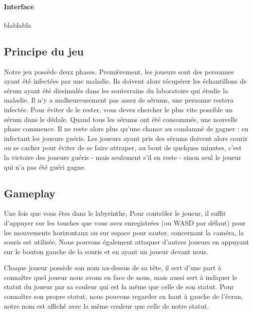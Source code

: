 \documentclass{article}
\begin{document}
\paragraph{Interface}
blablabla




\newpage
\subsection{Principe du jeu}


Notre jeu possède deux phases.
Premièrement, les joueurs sont des personnes ayant été infectées par une maladie. Ils doivent alors récupérer les échantillons de sérum ayant été dissimulés dans les souterrains du laboratoire qui étudie la maladie. Il n'y a malheureusement pas assez de sérums, une personne restera infectée. Pour éviter de le rester, vous devez chercher le plus vite possible un sérum dans le dédale.
Quand tous les sérums ont été consommés, une nouvelle phase commence. Il ne reste alors plus qu'une chance au condamné de gagner : en infectant les joueurs guéris. Les joueurs ayant pris des sérums doivent alors courir ou se cacher pour éviter de se faire attraper, au bout de quelques minutes, c'est la victoire des joueurs guéris - mais seulement s'il en reste - sinon seul le joueur qui n'a pas été guéri gagne.




\subsection{Gameplay}


Une fois que vous êtes dans le labyrinthe,
Pour contrôler le joueur, il suffit d'appuyer sur les touches que vous avez enregistrées (ou WASD par défaut) pour les mouvements horizontaux ou sur espace pour sauter, concernant la caméra, la souris est utilisée. Nous pouvons également attaquer d'autres joueurs en appuyant sur le bouton gauche de la souris et en ayant un joueur devant nous.




Chaque joueur possède son nom au-dessus de sa tête, il sert d'une part à connaître quel joueur nous avons en face de nous, mais aussi sert à indiquer le statut du joueur par sa couleur qui est la même que celle de son statut.
Pour connaître son propre statut, nous pouvons regarder en haut à gauche de l'écran, notre nom est affiché avec la même couleur que celle de notre statut.
\end{document}
